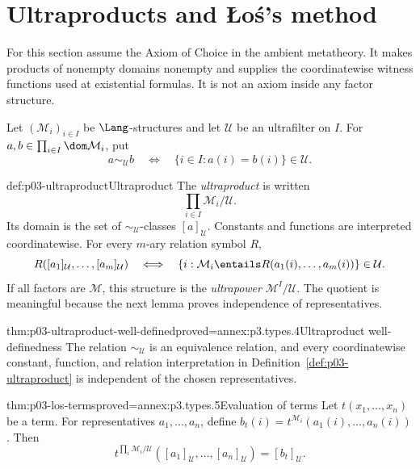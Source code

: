 \section{Ultraproducts and \L o\'s's method}
\label{sec:p03-ultraproducts}

For this section assume the Axiom of Choice in the ambient metatheory.  It
makes products of nonempty domains nonempty and supplies the coordinatewise
witness functions used at existential formulas.  It is not an axiom inside
any factor structure.

Let \((\mathcal M_i)_{i\in I}\) be \(\Lang\)-structures and let
\(\mathcal U\) be an ultrafilter on \(I\).  For
\(a,b\in\prod_{i\in I}\dom\mathcal M_i\), put
\[
 a\sim_{\mathcal U}b
 \quad\Longleftrightarrow\quad
 \{i\in I:a(i)=b(i)\}\in\mathcal U.
\]

\begin{hbdefinition}{def:p03-ultraproduct}{Ultraproduct}
The \emph{ultraproduct} is written
\[
 \prod_{i\in I}\mathcal M_i/\mathcal U.
\]
Its domain is the set of \(\sim_{\mathcal U}\)-classes
\([a]_{\mathcal U}\).  Constants
and functions are interpreted coordinatewise.  For every \(m\)-ary relation
symbol \(R\),
\[
 R([a_1]_{\mathcal U},\ldots,[a_m]_{\mathcal U})
 \quad\Longleftrightarrow\quad
 \{i:\mathcal M_i\entails
 R(a_1(i),\ldots,a_m(i))\}\in\mathcal U.
\]
If all factors are \(\mathcal M\), this structure is the \emph{ultrapower}
\(\mathcal M^I/\mathcal U\).  The quotient is meaningful because the next
lemma proves independence of representatives.
\end{hbdefinition}

\begin{hblemma}{thm:p03-ultraproduct-well-defined}{proved=annex:p3.types.4}{Ultraproduct well-definedness}
The relation \(\sim_{\mathcal U}\) is an equivalence relation, and every
coordinatewise constant, function, and relation interpretation in
Definition~\ref{def:p03-ultraproduct} is independent of the chosen
representatives.
\end{hblemma}

\begin{hblemma}{thm:p03-los-terms}{proved=annex:p3.types.5}{Evaluation of terms}
Let \(t(x_1,\ldots,x_n)\) be a term.  For representatives
\(a_1,\ldots,a_n\), define \(b_t(i)=t^{\mathcal M_i}
(a_1(i),\ldots,a_n(i))\).  Then
\[
 t^{\prod_i\mathcal M_i/\mathcal U}
 ([a_1]_{\mathcal U},\ldots,[a_n]_{\mathcal U})=[b_t]_{\mathcal U}.
\]
\end{hblemma}

